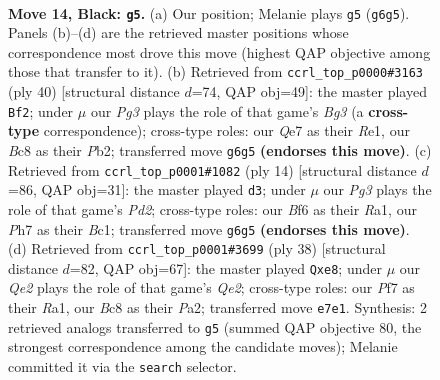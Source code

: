 \documentclass[11pt]{article}
\begin{document}
\clearpage

\begin{figure}[p]\centering
\begin{subfigure}{0.46\textwidth}\centering
\resizebox{\linewidth}{!}{%
\newchessgame
\chessboard[
  setfen={r1b3k1/ppppqp1p/3n1bp1/8/8/BPN2P2/P1PP2PP/R3QBK1 b - - 2 14},
  showmover=false,
  pgfstyle=straightmove, color=movearrow, markmove={g6-g5}
]}
\caption{}
\end{subfigure}\hfill
\begin{subfigure}{0.46\textwidth}\centering
\resizebox{\linewidth}{!}{%
\newchessgame
\chessboard[
  setfen={r2qn1k1/bp3pp1/p5bp/3p4/P2N4/2P2PB1/1P1Q2PP/4RBK1 w - - 1 21},
  showmover=false,
  pgfstyle=straightmove, color=movearrow, markmove={g3-f2}
]}
\caption{}
\end{subfigure}
\\[4pt]
\begin{subfigure}{0.46\textwidth}\centering
\resizebox{\linewidth}{!}{%
\newchessgame
\chessboard[
  setfen={rn1qkb1r/pp2pp1p/2p2p2/7b/8/5N1P/PPPPQPP1/R1B1KB1R w KQkq - 0 8},
  showmover=false,
  pgfstyle=straightmove, color=movearrow, markmove={d2-d3}
]}
\caption{}
\end{subfigure}\hfill
\begin{subfigure}{0.46\textwidth}\centering
\resizebox{\linewidth}{!}{%
\newchessgame
\chessboard[
  setfen={r3qbk1/pb3ppp/3p1n2/1Pp5/8/2B2NP1/PP2QPBP/R5K1 w - - 4 20},
  showmover=false,
  pgfstyle=straightmove, color=movearrow, markmove={e2-e8}
]}
\caption{}
\end{subfigure}
\caption{\textbf{Move 14, Black: \texttt{g5}.} (a) Our position; Melanie plays \texttt{g5} (\texttt{g6g5}). Panels (b)--(d) are the retrieved master positions whose correspondence most drove this move (highest QAP objective among those that transfer to it). (b) Retrieved from \texttt{ccrl\_top\_p0000\#3163} (ply 40) [structural distance $d$=74, QAP obj=49]: the master played \texttt{Bf2}; under $\mu$ our \emph{Pg3} plays the role of that game's \emph{Bg3} (a \textbf{cross-type} correspondence); cross-type roles: our \emph{Q}e7 as their \emph{R}e1, our \emph{B}c8 as their \emph{P}b2; transferred move \texttt{g6g5} \textbf{(endorses this move)}. (c) Retrieved from \texttt{ccrl\_top\_p0001\#1082} (ply 14) [structural distance $d$=86, QAP obj=31]: the master played \texttt{d3}; under $\mu$ our \emph{Pg3} plays the role of that game's \emph{Pd2}; cross-type roles: our \emph{B}f6 as their \emph{R}a1, our \emph{P}h7 as their \emph{B}c1; transferred move \texttt{g6g5} \textbf{(endorses this move)}. (d) Retrieved from \texttt{ccrl\_top\_p0001\#3699} (ply 38) [structural distance $d$=82, QAP obj=67]: the master played \texttt{Qxe8}; under $\mu$ our \emph{Qe2} plays the role of that game's \emph{Qe2}; cross-type roles: our \emph{P}f7 as their \emph{R}a1, our \emph{B}c8 as their \emph{P}a2; transferred move \texttt{e7e1}. Synthesis: 2 retrieved analogs transferred to \texttt{g5} (summed QAP objective 80, the strongest correspondence among the candidate moves); Melanie committed it via the \texttt{search} selector.}
\label{fig:thought-m27}
\end{figure}
\end{document}
